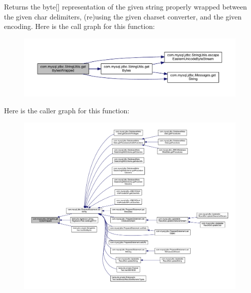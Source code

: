 Returns the byte\mbox{[}\mbox{]} representation of the given string properly wrapped between the given char delimiters, (re)using the given charset converter, and the given encoding. Here is the call graph for this function\+:
\nopagebreak
\begin{figure}[H]
\begin{center}
\leavevmode
\includegraphics[width=350pt]{classcom_1_1mysql_1_1jdbc_1_1_string_utils_afd812ec650baa8ee5d9218e48ec7e026_cgraph}
\end{center}
\end{figure}
Here is the caller graph for this function\+:
\nopagebreak
\begin{figure}[H]
\begin{center}
\leavevmode
\includegraphics[width=350pt]{classcom_1_1mysql_1_1jdbc_1_1_string_utils_afd812ec650baa8ee5d9218e48ec7e026_icgraph}
\end{center}
\end{figure}
\mbox{\label{classcom_1_1mysql_1_1jdbc_1_1_string_utils_a6d53939d6e9719bdac7d843213d387c8}} 
